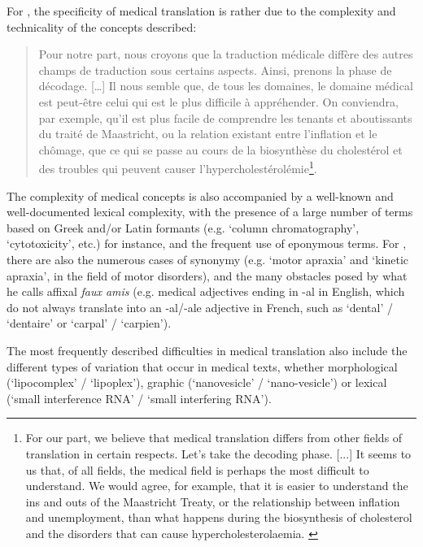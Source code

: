 \documentclass[output=paper]{langscibook}
\begin{document}
For \citet{Jammal1999}, the specificity of medical translation is rather due to the complexity and technicality of the concepts described:
\begin{quote}
Pour notre part, nous croyons que la traduction médicale diffère des autres champs de traduction sous certains aspects. Ainsi, prenons la phase de décodage. […] Il nous semble que, de tous les domaines, le domaine médical est peut-être celui qui est le plus difficile à appréhender. On conviendra, par exemple, qu’il est plus facile de comprendre les tenants et aboutissants du traité de Maastricht, ou la relation existant entre l’inflation et le chômage, que ce qui se passe au cours de la biosynthèse du cholestérol et des troubles qui peuvent causer l’hypercholestérolémie\footnote{For our part, we believe that medical translation differs from other fields of translation in certain respects. Let’s take the decoding phase. [...] It seems to us that, of all fields, the medical field is perhaps the most difficult to understand. We would agree, for example, that it is easier to understand the ins and outs of the Maastricht Treaty, or the relationship between inflation and unemployment, than what happens during the biosynthesis of cholesterol and the disorders that can cause hypercholesterolaemia. \citep[217]{Jammal1999}}. \citep[217]{Jammal1999}
\end{quote}
The complexity of medical concepts is also accompanied by a well-known and well-documented lexical complexity, with the presence of a large number of terms based on Greek and/or Latin formants (e.g. ‘column chromatography’, ‘cytotoxicity’, etc.) for instance, and the frequent use of eponymous terms. For \citet{Rouleau2003}, there are also the numerous cases of synonymy (e.g. ‘motor apraxia’ and ‘kinetic apraxia’, in the field of motor disorders), and the many obstacles posed by what he calls affixal \textit{faux amis} (e.g. medical adjectives ending in -al in English, which do not always translate into an -al/-ale adjective in French, such as ‘dental’ / ‘dentaire’ or ‘carpal’ / ‘carpien’).

The most frequently described difficulties in medical translation also include the different types of variation that occur in medical texts, whether morphological (‘lipocomplex’ / ‘lipoplex’), graphic (‘nanovesicle’ / ‘nano-vesicle’) or lexical (‘small interference RNA’ / ‘small interfering RNA’).
\end{document}
